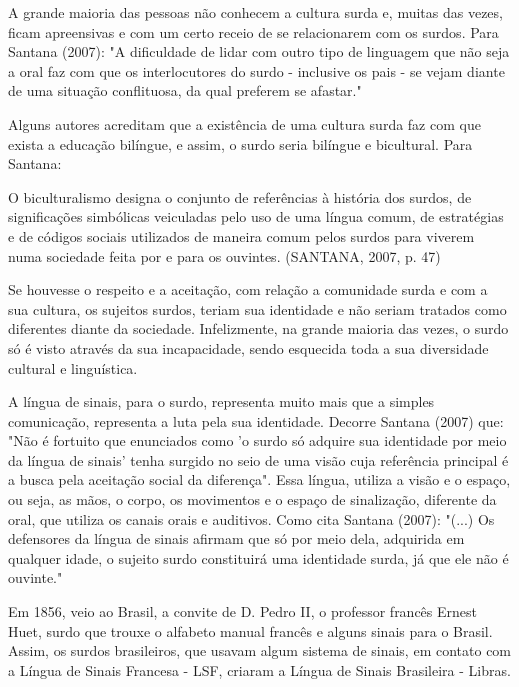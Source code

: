 \documentclass[brasil]{abnt}
\begin{document}
		A grande maioria das pessoas não conhecem a cultura surda e, muitas das vezes, ficam apreensivas e com um certo receio de se relacionarem com os surdos. Para Santana (2007): "A dificuldade de lidar 
		com outro tipo de linguagem que não seja a oral faz com que os interlocutores do surdo - inclusive os pais - se vejam diante de uma situação conflituosa, da qual preferem se afastar."		
		
		Alguns autores acreditam que a existência de uma cultura surda faz com que exista a educação bilíngue, e assim, o surdo seria bilíngue e bicultural. Para Santana:
		
			\begin{citacao} O biculturalismo designa o conjunto de referências à história dos surdos, de significações simbólicas veiculadas pelo uso de uma língua comum, de estratégias e de códigos sociais
							utilizados de maneira comum pelos surdos para viverem numa sociedade feita por e para os ouvintes. (SANTANA, 2007, p. 47)	
			\end{citacao}
			
		Se houvesse o respeito e a aceitação, com relação a comunidade surda e com a sua cultura, os sujeitos surdos, teriam sua identidade e não seriam tratados como diferentes diante da 
		sociedade. Infelizmente, na grande maioria das vezes, o surdo só é visto através da sua incapacidade, sendo esquecida toda a sua diversidade cultural e linguística. 
		
		A língua de sinais, para o surdo, representa muito mais que a simples comunicação, representa a luta pela sua identidade. Decorre Santana (2007) que: "Não é fortuito que enunciados como 
		'o surdo só adquire sua identidade por meio da língua de sinais' tenha surgido no seio de uma visão cuja referência principal é a busca pela aceitação social da diferença". Essa língua, 
		utiliza a visão e o espaço, ou seja, as mãos, o corpo, os movimentos e o espaço de sinalização, diferente da oral, que utiliza os canais orais e auditivos. Como cita Santana (2007): "(...) Os 
		defensores da língua de sinais afirmam que só por meio dela, adquirida em qualquer idade, o sujeito surdo constituirá uma identidade surda, já que ele não é ouvinte."
			
		Em 1856, veio ao Brasil, a convite de D. Pedro II, o professor francês Ernest Huet, surdo que trouxe o alfabeto manual francês e alguns sinais para o Brasil. Assim, os surdos brasileiros, que 
		usavam algum sistema de sinais, em contato com a Língua de Sinais Francesa - LSF, criaram a Língua de Sinais Brasileira - Libras. 
		
\end{document}
